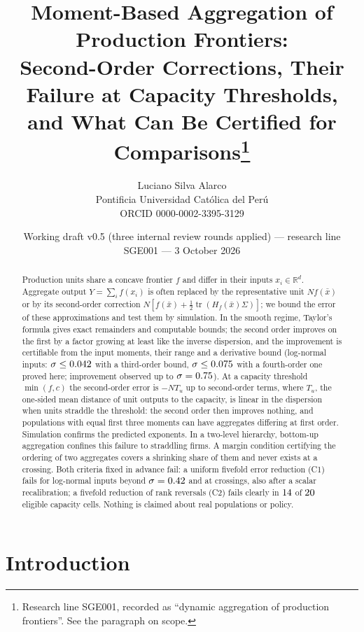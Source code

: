 \documentclass[10pt,a4paper]{article}
\title{\textbf{Moment-Based Aggregation of Production Frontiers:}\\[2pt]
\large Second-Order Corrections, Their Failure at Capacity Thresholds,\\ and What Can Be Certified for Comparisons\thanks{Research line SGE001, recorded as ``dynamic aggregation of production frontiers''. See the paragraph on scope.}}
\author{Luciano Silva Alarco\\
\small Pontificia Universidad Cat\'olica del Per\'u\\
\small ORCID 0000-0002-3395-3129}
\date{\small Working draft v0.5 (three internal review rounds applied) --- research line SGE001 --- 3 October 2026}
\theoremstyle{plain}
\theoremstyle{definition}
\theoremstyle{remark}
\newcommand{\R}{\mathbb{R}}
\newcommand{\tr}{\operatorname{tr}}
\newcommand{\Hf}{H_f}
\newcommand{\Tu}{T_u}
\begin{document}
\maketitle

\begin{abstract}
\noindent
Production units share a concave frontier $f$ and differ in their inputs $x_i\in\R^d$. Aggregate output $Y=\sum_i f(x_i)$ is often replaced by the representative unit $Nf(\bar x)$ or by its second-order correction $N[f(\bar x)+\tfrac12\tr(\Hf(\bar x)\Sigma)]$; we bound the error of these approximations and test them by simulation. In the smooth regime, Taylor's formula gives exact remainders and computable bounds; the second order improves on the first by a factor growing at least like the inverse dispersion, and the improvement is certifiable from the input moments, their range and a derivative bound (log-normal inputs: $\sigma\le0.042$ with a third-order bound, $\sigma\le0.075$ with a fourth-order one proved here; improvement observed up to $\sigma=0.75$). At a capacity threshold $\min(f,c)$ the second-order error is $-N\Tu$ up to second-order terms, where $\Tu$, the one-sided mean distance of unit outputs to the capacity, is linear in the dispersion when units straddle the threshold: the second order then improves nothing, and populations with equal first three moments can have aggregates differing at first order. Simulation confirms the predicted exponents. In a two-level hierarchy, bottom-up aggregation confines this failure to straddling firms. A margin condition certifying the ordering of two aggregates covers a shrinking share of them and never exists at a crossing. Both criteria fixed in advance fail: a uniform fivefold error reduction (C1) fails for log-normal inputs beyond $\sigma=0.42$ and at crossings, also after a scalar recalibration; a fivefold reduction of rank reversals (C2) fails clearly in $14$ of $20$ eligible capacity cells. Nothing is claimed about real populations or policy.
\end{abstract}

\section{Introduction}\label{sec:intro}
\end{document}
